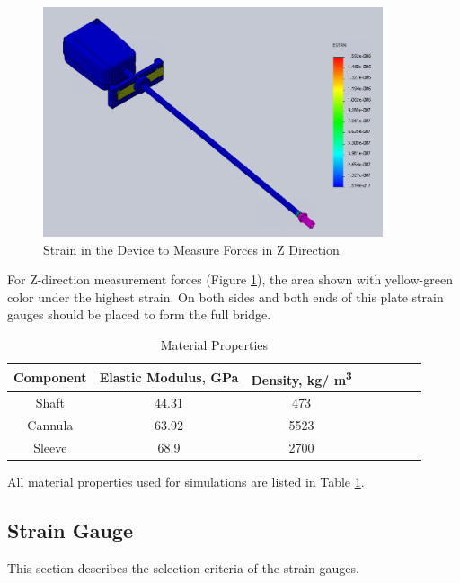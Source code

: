 \begin{figure}[h]
	\begin{center}
		\includegraphics[width=100mm]{fig/methods/z_dir_sim.png}
	\end{center}
	\vspace{-4mm}
	\caption[Strain in the Device to Measure Forces in Z Direction]
	{Strain in the Device to Measure Forces in Z Direction}
	\label{fig:Zdev}
	\vspace{-2mm}
\end{figure}

For Z-direction measurement forces (Figure \ref{fig:Zdev}), the area shown with yellow-green color under the highest strain. On both sides and both ends of this plate strain gauges should be placed to form the full bridge.

\begin{table}
\caption {Material Properties} \label{tab:matProp} 
\begin{center}
\begin{tabular}{ | c | c | c | c | c | c | c | c | } 
\hline
Component & Elastic Modulus, GPa & Density, kg/ m\textsuperscript{3} \\ 
\hline
Shaft & 44.31 & 473\\ 
\hline
Cannula & 63.92 & 5523 \\ 
\hline
Sleeve & 68.9 & 2700  \\ 
\hline
\end{tabular}
\end{center}
\end{table}

All material properties used for simulations are listed in Table \ref{tab:matProp}.

\subsection{Strain Gauge}
	\label{sec:SGReq}
This section describes the selection criteria of the strain gauges.	


